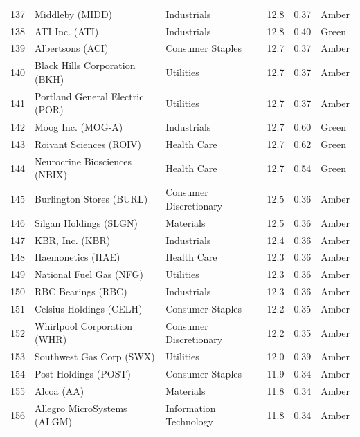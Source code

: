 \documentclass[11pt,a4paper]{article}
\begin{document}
{\begin{longtable}{r p{4.6cm} p{3cm} r r l}
137 & Middleby (MIDD) & Industrials & 12.8 & 0.37 & \cellcolor[HTML]{FFEB9C}Amber \\
138 & ATI Inc. (ATI) & Industrials & 12.8 & 0.40 & \cellcolor[HTML]{C6EFCE}Green \\
139 & Albertsons (ACI) & Consumer Staples & 12.7 & 0.37 & \cellcolor[HTML]{FFEB9C}Amber \\
140 & Black Hills Corporation (BKH) & Utilities & 12.7 & 0.37 & \cellcolor[HTML]{FFEB9C}Amber \\
141 & Portland General Electric (POR) & Utilities & 12.7 & 0.37 & \cellcolor[HTML]{FFEB9C}Amber \\
142 & Moog Inc. (MOG-A) & Industrials & 12.7 & 0.60 & \cellcolor[HTML]{C6EFCE}Green \\
143 & Roivant Sciences (ROIV) & Health Care & 12.7 & 0.62 & \cellcolor[HTML]{C6EFCE}Green \\
144 & Neurocrine Biosciences (NBIX) & Health Care & 12.7 & 0.54 & \cellcolor[HTML]{C6EFCE}Green \\
145 & Burlington Stores (BURL) & Consumer Discretionary & 12.5 & 0.36 & \cellcolor[HTML]{FFEB9C}Amber \\
146 & Silgan Holdings (SLGN) & Materials & 12.5 & 0.36 & \cellcolor[HTML]{FFEB9C}Amber \\
147 & KBR, Inc. (KBR) & Industrials & 12.4 & 0.36 & \cellcolor[HTML]{FFEB9C}Amber \\
148 & Haemonetics (HAE) & Health Care & 12.3 & 0.36 & \cellcolor[HTML]{FFEB9C}Amber \\
149 & National Fuel Gas (NFG) & Utilities & 12.3 & 0.36 & \cellcolor[HTML]{FFEB9C}Amber \\
150 & RBC Bearings (RBC) & Industrials & 12.3 & 0.36 & \cellcolor[HTML]{FFEB9C}Amber \\
151 & Celsius Holdings (CELH) & Consumer Staples & 12.2 & 0.35 & \cellcolor[HTML]{FFEB9C}Amber \\
152 & Whirlpool Corporation (WHR) & Consumer Discretionary & 12.2 & 0.35 & \cellcolor[HTML]{FFEB9C}Amber \\
153 & Southwest Gas Corp (SWX) & Utilities & 12.0 & 0.39 & \cellcolor[HTML]{FFEB9C}Amber \\
154 & Post Holdings (POST) & Consumer Staples & 11.9 & 0.34 & \cellcolor[HTML]{FFEB9C}Amber \\
155 & Alcoa (AA) & Materials & 11.8 & 0.34 & \cellcolor[HTML]{FFEB9C}Amber \\
156 & Allegro MicroSystems (ALGM) & Information Technology & 11.8 & 0.34 & \cellcolor[HTML]{FFEB9C}Amber \\

\end{longtable}}
\end{document}
